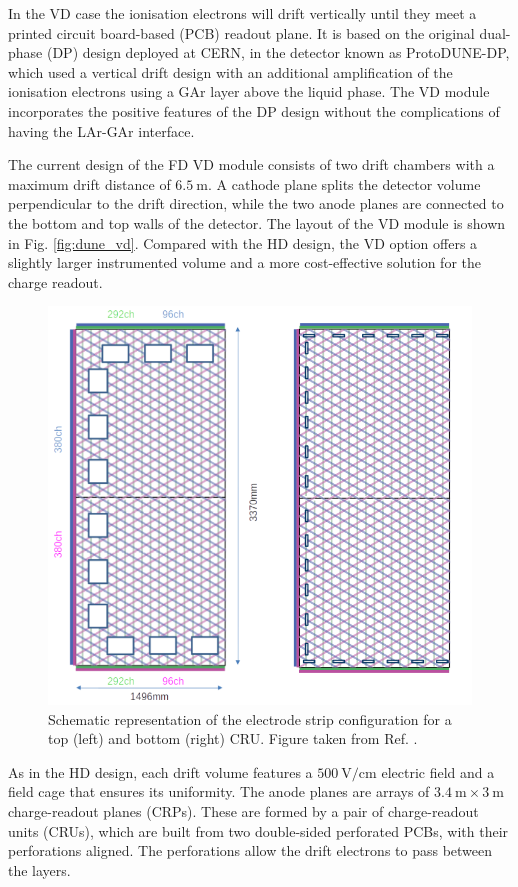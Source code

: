 In the VD case the ionisation electrons will drift vertically until they meet a printed circuit board-based (PCB) readout plane. It is based on the original dual-phase (DP) design deployed at CERN, in the detector known as ProtoDUNE-DP, which used a vertical drift design with an additional amplification of the ionisation electrons using a GAr layer above the liquid phase. The VD module incorporates the positive features of the DP design without the complications of having the LAr-GAr interface.

The current design of the FD VD module consists of two drift chambers with a maximum drift distance of $6.5~\mathrm{m}$. A cathode plane splits the detector volume perpendicular to the drift direction, while the two anode planes are connected to the bottom and top walls of the detector. The layout of the VD module is shown in Fig. \ref{fig:dune_vd}. Compared with the HD design, the VD option offers a slightly larger instrumented volume and a more cost-effective solution for the charge readout.

\begin{figure}[t]
	\centering
	\includegraphics[width=0.70\linewidth]{Images/DUNE/FD/3V_anode_layout}
	\caption[Schematic representation of the electrode strip configuration for a top and bottom CRU.]{Schematic representation of the electrode strip configuration for a top (left) and bottom (right) CRU. Figure taken from Ref. \cite{DUNEVDTDR}.}
	\label{fig:dune_cru}
\end{figure}

As in the HD design, each drift volume features a $500~\mathrm{V/cm}$ electric field and a field cage that ensures its uniformity. The anode planes are arrays of $3.4~\mathrm{m}\times3~\mathrm{m}$ charge-readout planes (CRPs). These are formed by a pair of charge-readout units (CRUs), which are built from two double-sided perforated PCBs, with their perforations aligned. The perforations allow the drift electrons to pass between the layers.

